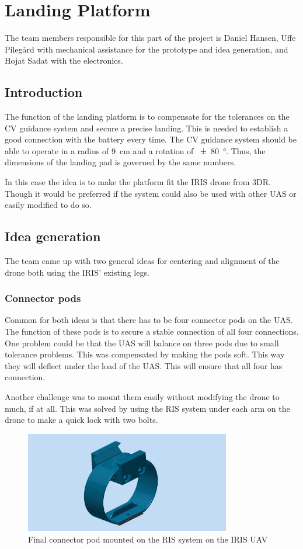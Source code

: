 \section{Landing Platform}
The team members responsible for this part of the project is Daniel Hansen, Uffe Pilegård with mechanical assistance for the prototype and idea generation, and Hojat Sadat with the electronics.
\subsection{Introduction}
The function of the landing platform is to compensate for the tolerances on the CV guidance system and secure a precise landing. This is needed to establish a good connection with the battery every time. The CV guidance system should be able to operate in a radius of \SI{9}{\centi\meter} and a rotation of \SI{\pm 80}{\degree}. Thus, the dimensions of the landing pad is governed by the same numbers.

In this case the idea is to make the platform fit the IRIS drone from 3DR. Though it would be preferred if the system could also be used with other UAS or easily modified to do so.
\subsection{Idea generation}
The team came up with two general ideas for centering and alignment of the drone both using the IRIS' existing legs.
\subsubsection{Connector pods}
Common for both ideas is that there has to be four connector pods on the UAS. The function of these pods is to secure a stable connection of all four connections. One problem could be that the UAS will balance on three pods due to small tolerance problems. This was compensated by making the pods soft. This way they will deflect under the load of the UAS. This will ensure that all four has connection.

Another challenge  was to mount them easily without modifying the drone to much, if at all. This was solved by using the RIS system under each arm on the drone to make a quick lock with two bolts.
\begin{figure}
	\centering
	\includegraphics[width=0.8\textwidth]{imgs/connectorpod}
	\caption{Final connector pod mounted on the RIS system on the IRIS UAV}
\end{figure}
